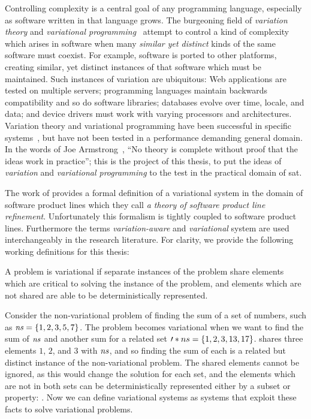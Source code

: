 \label{chapter:introduction}%
%
Controlling complexity is a central goal of any programming language, especially
as software written in that language grows. The burgeoning field of
\emph{variation theory} and \emph{variational
  programming}~\cite{EW11gttse,EW11tosem,HW16fosd,CEW16ecoop,Walk14onward}
attempt to control a kind of complexity which arises in software when many
\emph{similar yet distinct} kinds of the same software must coexist. For
example, software is ported to other platforms, creating similar, yet distinct
instances of that software which must be maintained. Such instances of variation
are ubiquitous: Web applications are tested on multiple servers; programming
languages maintain backwards compatibility and so do software libraries;
databases evolve over time, locale, and data; and device drivers must work with
varying processors and architectures. Variation theory and variational
programming have been successful in specific
systems~\cite{ES18diagrams,SE17fosd,MMWWK17vamos}, but have not been tested in a
performance demanding general domain. In the words of Joe
Armstrong~\cite{armstrongThesis}, ``No theory is complete without proof that the
ideas work in practice''; this is the project of this thesis, to put the ideas
of \emph{variation} and \emph{variational programming} to the test in the
practical domain of \acl{sat}.

The work of \citet{SPLRefinementThoery} provides a formal definition of a
variational system in the domain of software product lines which they call
\emph{a theory of software product line refinement}. Unfortunately this
formalism is tightly coupled to software product lines. Furthermore the terms
\emph{variation-aware} and \emph{variational} system are used interchangeably in
the research literature. For clarity, we provide the following working
definitions for this thesis:

\begin{definition}
  A problem is variational if separate instances of the problem share elements
  which are critical to solving the instance of the problem, and elements which
  are not shared are able to be deterministically represented.
\end{definition}
%
Consider the non-variational problem of finding the sum of a set of numbers,
such as $\kf{ns} = \set{1,2,3,5,7}$. The problem becomes variational when we
want to find the sum of $\mathit{ns}$ and another sum for a related set $\prime*{ns}
= \set{1,2,3,13,17}$.  shares three elements $1$, $2$, and $3$ with
$\mathit{ns}$, and so finding the sum of each is a related but distinct instance of
the non-variational problem. The shared elements cannot be ignored, as this
would change the solution for each set, and the elements which are not in both
sets can be deterministically represented either by a subset or property:
.
%
Now we can define variational systems as systems that exploit these facts to
solve variational problems.

